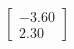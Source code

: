 \documentclass[preview]{standalone}
\begin{document}
\begin{align*}
\begin{bmatrix} -3.60 \\ 2.30 \end{bmatrix}
\end{align*}
\end{document}
